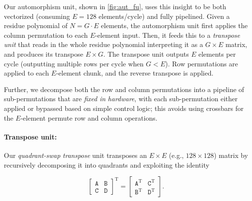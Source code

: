 Our automorphism unit, shown in \autoref{fig:aut_fu},
uses this insight to be both vectorized (consuming $E=128$ elements/cycle) and fully pipelined.
Given a residue polynomial of $N=G\cdot E$ elements, the automorphism unit first applies the column permutation
to each $E$-element input.
Then, it feeds this to a \emph{transpose unit} that reads in the whole residue polynomial interpreting it as a $G\times E$ matrix,
and produces its transpose $E\times G$.
The transpose unit outputs $E$ elements per cycle (outputting multiple rows per cycle when $G < E$).
Row permutations are applied to each $E$-element chunk, and the reverse transpose is applied.


Further, we decompose both the row and column permutations into a pipeline of sub-permutations that are \textit{fixed in hardware},
with each sub-permutation either applied or bypassed based on simple control logic; this avoids using crossbars for the $E$-element permute row and column operations.

\figQuadrantSwap

\paragraph{Transpose unit:}
Our \textit{quadrant-swap transpose} unit transposes an $E \times E$ (e.g., $128\times 128$) matrix by recursively decomposing it into quadrants and exploiting
the identity

\vspace{-12pt}
\begin{equation*}
  \left[ \begin{array}{c|c}
      \texttt{A} & \texttt{B}\\
      \hline
      \texttt{C} & \texttt{D}
  \end{array}\right]^{\textrm{T}} =   \left[ \begin{array}{c|c}
      \texttt{A}^{\textrm{T}} & \texttt{C}^{\textrm{T}} \\
      \hline
      \texttt{B}^{\textrm{T}} & \texttt{D}^{\textrm{T}}
  \end{array}\right].
\end{equation*}

